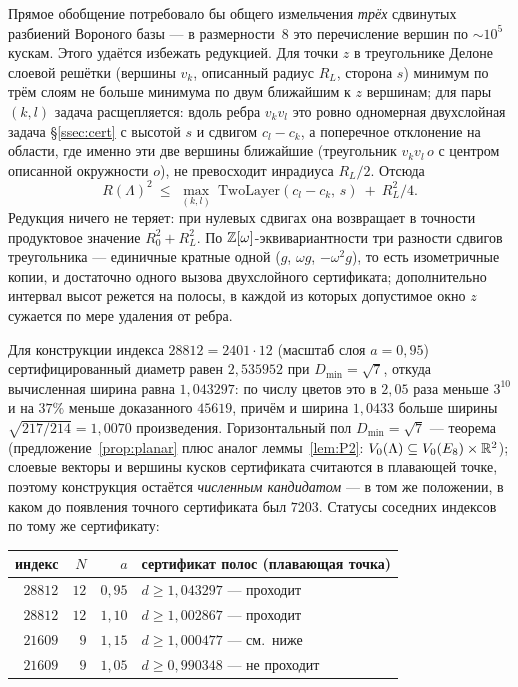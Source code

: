 Прямое обобщение потребовало бы общего измельчения \emph{трёх} сдвинутых
разбиений Вороного базы --- в размерности~$8$ это перечисление вершин по
${\sim}10^5$ кускам. Этого удаётся избежать редукцией. Для точки $z$ в
треугольнике Делоне слоевой решётки (вершины $v_k$, описанный радиус $R_L$,
сторона $s$) минимум по трём слоям не больше минимума по двум ближайшим к $z$
вершинам; для пары $(k,l)$ задача расщепляется: вдоль ребра $v_kv_l$ это ровно
одномерная двухслойная задача \S\ref{ssec:cert} с высотой $s$ и сдвигом
$c_l-c_k$, а поперечное отклонение на области, где именно эти две вершины
ближайшие (треугольник $v_kv_l\,o$ с центром описанной окружности $o$), не
превосходит инрадиуса $R_L/2$. Отсюда
\[
R(\Lambda)^2\ \le\ \max_{(k,l)}\ \mathrm{TwoLayer}(c_l-c_k,\,s)\ +\ R_L^2/4 .
\]
Редукция ничего не теряет: при нулевых сдвигах она возвращает в точности
продуктовое значение $R_0^2+R_L^2$. По $\mathbb{Z}[\omega]$-эквивариантности три
разности сдвигов треугольника --- единичные кратные одной
($g$, $\omega g$, $-\omega^2 g$), то есть изометричные копии, и достаточно
одного вызова двухслойного сертификата; дополнительно интервал высот режется
на полосы, в каждой из которых допустимое окно $z$ сужается по мере удаления
от ребра.

Для конструкции индекса $28812=2401\cdot12$ (масштаб слоя $a=0{,}95$)
сертифицированный диаметр равен $2{,}535952$ при $D_{\min}=\sqrt7$, откуда
вычисленная ширина равна $1{,}043297$: по числу цветов это в $2{,}05$ раза
меньше $3^{10}$ и на $37\%$ меньше доказанного $45619$, причём и ширина
$1{,}0433$ больше ширины $\sqrt{217/214}=1{,}0070$ произведения. Горизонтальный
пол $D_{\min}=\sqrt7$ --- теорема (предложение~\ref{prop:planar} плюс аналог
леммы~\ref{lem:P2}: $V_0(\Lambda)\subseteq V_0(E_8)\times\mathbb{R}^2$); слоевые
векторы и вершины кусков сертификата считаются в плавающей точке, поэтому
конструкция остаётся \emph{численным кандидатом} --- в том же положении, в
каком до появления точного сертификата был $7203$. Статусы соседних
индексов по тому же сертификату:

\begin{center}\small
\begin{tabular}{r r r l}
\toprule
индекс & $N$ & $a$ & сертификат полос (плавающая точка)\\
\midrule
$28812$ & $12$ & $0{,}95$ & $d\ge1{,}043297$ --- проходит\\
$28812$ & $12$ & $1{,}10$ & $d\ge1{,}002867$ --- проходит\\
$21609$ & $9$  & $1{,}15$ & $d\ge1{,}000477$ --- см.\ ниже\\
$21609$ & $9$  & $1{,}05$ & $d\ge0{,}990348$ --- не проходит\\
\bottomrule
\end{tabular}
\end{center}

